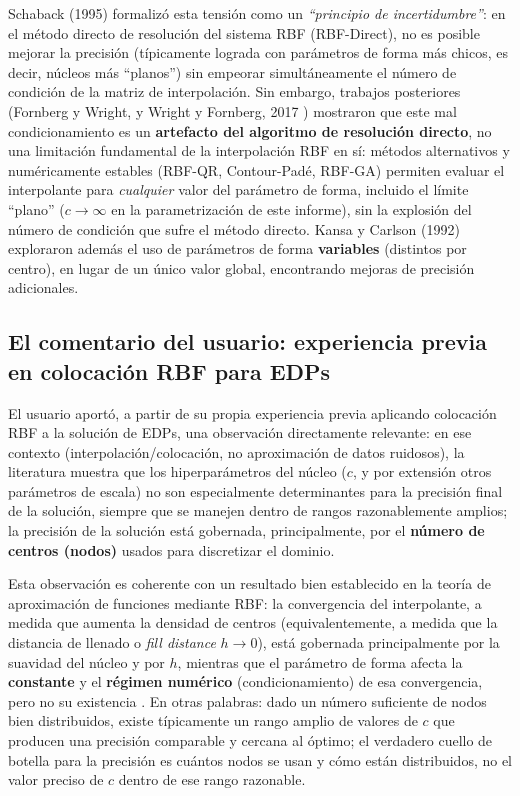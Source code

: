 \documentclass[11pt,a4paper]{article}
\begin{document}
Schaback (1995) \cite{schaback1995} formaliz\'o esta tensi\'on como un
\emph{``principio de incertidumbre''}: en el m\'etodo directo de resoluci\'on
del sistema RBF (RBF-Direct), no es posible mejorar la precisi\'on
(t\'ipicamente lograda con par\'ametros de forma m\'as chicos, es decir,
n\'ucleos m\'as ``planos'') sin empeorar simult\'aneamente el n\'umero de
condici\'on de la matriz de interpolaci\'on. Sin embargo, trabajos
posteriores (Fornberg y Wright, y Wright y Fornberg, 2017
\cite{wright2017}) mostraron que este mal condicionamiento es un
\textbf{artefacto del algoritmo de resoluci\'on directo}, no una limitaci\'on
fundamental de la interpolaci\'on RBF en s\'i: m\'etodos alternativos y
num\'ericamente estables (RBF-QR, Contour-Pad\'e, RBF-GA) permiten evaluar
el interpolante para \emph{cualquier} valor del par\'ametro de forma,
incluido el l\'imite ``plano'' ($c\to\infty$ en la parametrizaci\'on de este
informe), sin la explosi\'on del n\'umero de condici\'on que sufre el
m\'etodo directo. Kansa y Carlson (1992) \cite{kansa1992} exploraron adem\'as
el uso de par\'ametros de forma \textbf{variables} (distintos por centro), en
lugar de un \'unico valor global, encontrando mejoras de precisi\'on
adicionales.

\subsection{El comentario del usuario: experiencia previa en colocaci\'on RBF para EDPs}

El usuario aport\'o, a partir de su propia experiencia previa aplicando
colocaci\'on RBF a la soluci\'on de EDPs, una observaci\'on directamente
relevante: en ese contexto (interpolaci\'on/colocaci\'on, no aproximaci\'on de
datos ruidosos), la literatura muestra que los hiperpar\'ametros del n\'ucleo
($c$, y por extensi\'on otros par\'ametros de escala) no son especialmente
determinantes para la precisi\'on final de la soluci\'on, siempre que se
manejen dentro de rangos razonablemente amplios; la precisi\'on de la
soluci\'on est\'a gobernada, principalmente, por el \textbf{n\'umero de
centros (nodos)} usados para discretizar el dominio.

Esta observaci\'on es coherente con un resultado bien establecido en la
teor\'ia de aproximaci\'on de funciones mediante RBF: la convergencia del
interpolante, a medida que aumenta la densidad de centros (equivalentemente,
a medida que la distancia de llenado o \emph{fill distance} $h\to0$), est\'a
gobernada principalmente por la suavidad del n\'ucleo y por $h$, mientras que
el par\'ametro de forma afecta la \textbf{constante} y el \textbf{r\'egimen
num\'erico} (condicionamiento) de esa convergencia, pero no su existencia
\cite{wendland2005,fasshauer2007}. En otras palabras: dado un n\'umero
suficiente de nodos bien distribuidos, existe t\'ipicamente un rango amplio
de valores de $c$ que producen una precisi\'on comparable y cercana al
\'optimo; el verdadero cuello de botella para la precisi\'on es cu\'antos
nodos se usan y c\'omo est\'an distribuidos, no el valor preciso de $c$
dentro de ese rango razonable.
\end{document}
